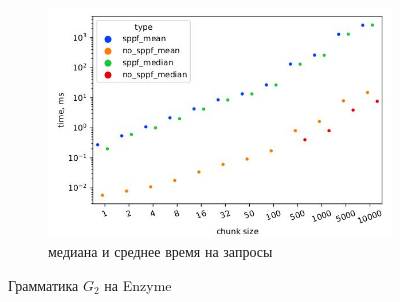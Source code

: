 \documentclass[14pt]{matmex-diploma-custom}
\theoremstyle{definition}
\begin{document}
\begin{figure}[H]
\begin{subfigure}[b]{0.5\textwidth}
    \includegraphics[width=\textwidth]{pics/subclass_sppf_mean&median.pdf_1.jpg}  \caption{медиана и среднее время на запросы}
    \label{fig:subim0}
    \end{subfigure} \caption{Грамматика $G_2$ на Enzyme}
        \end{figure}
\end{document}
